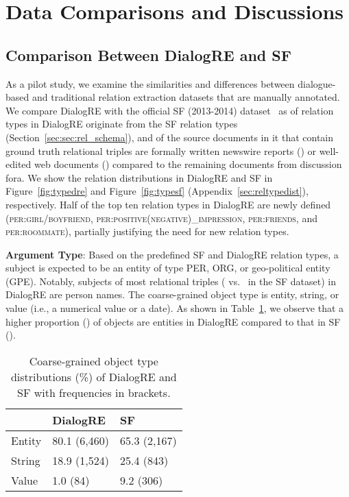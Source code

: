 \documentclass[11pt,a4paper]{article}
\newcommand{\ie}{{i.e.}}
\newcommand{\vs}{{vs.}}
\begin{document}
\section{Data Comparisons and Discussions}
\label{sec:data_analysis}

\subsection{Comparison Between DialogRE and SF}
\label{sec:comparison_with_sf}

As a pilot study, we examine the similarities and differences between dialogue-based and traditional relation extraction datasets that are manually annotated. We compare DialogRE with the official SF (2013-2014) dataset~\cite{surdeanu2013overview,surdeanu2014overview} as  of relation types in DialogRE originate from the SF relation types (Section~\ref{sec:sec:rel_schema}), and  of the source documents in it that contain ground truth relational triples are formally written newswire reports () or well-edited web documents () compared to the remaining documents from discussion fora. 
We show the relation distributions in DialogRE and SF in Figure~\ref{fig:typedre} and Figure~\ref{fig:typesf} (Appendix~\ref{sec:reltypedist}), respectively. Half of the top ten relation types in DialogRE are newly defined (\textsc{per:girl/boyfriend}, \textsc{per:positive(negative)\_impression}, \textsc{per:friends}, and \textsc{per:roommate}), partially justifying the need for new relation types.


\medskip

\noindent \textbf{Argument Type}: Based on the predefined SF and DialogRE relation types, a subject is expected to be an entity of type PER, ORG, or geo-political entity (GPE). Notably, subjects of most relational triples ( \vs~  in the SF dataset) in DialogRE are person names. The coarse-grained object type is entity, string, or value (\ie, a numerical value or a date). As shown in Table~\ref{tab:object_type}, we observe that a higher proportion () of objects are entities in DialogRE compared to that in SF ().

\begin{table}[h!]
\footnotesize
\centering
\begin{tabular}{lll}
\toprule
                         & \textbf{DialogRE}              & \textbf{SF} \\
\midrule
Entity                   & 80.1  (6,460)                  & 65.3 (2,167)\\
String                   & 18.9  (1,524)                  & 25.4 (843)\\
Value                    & 1.0   (84)                     & 9.2 (306) \\
\bottomrule
\end{tabular}
\caption{Coarse-grained object type distributions (\%) of DialogRE and SF with frequencies in brackets.} 
\label{tab:object_type}
\end{table}
\end{document}
